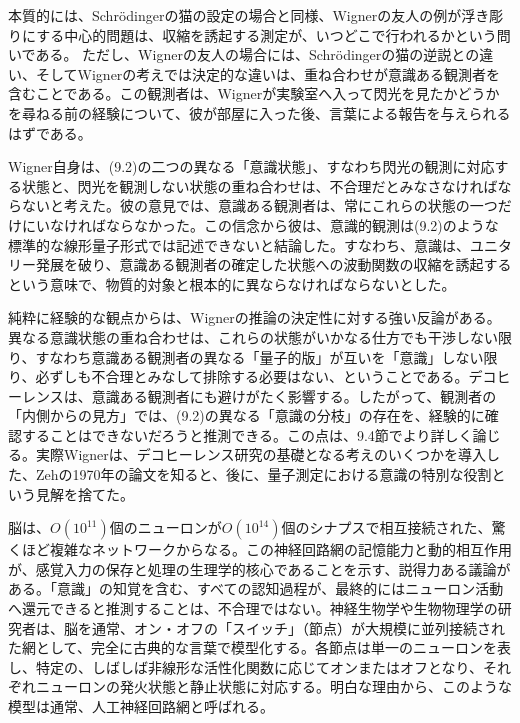 本質的には、Schrödingerの猫の設定の場合と同様、Wignerの友人の例が浮き彫りにする中心的問題は、収縮を誘起する測定が、いつどこで行われるかという問いである。
\hypertarget{srcpage:365}{}\label{srcpage:365}
ただし、Wignerの友人の場合には、Schrödingerの猫の逆説との違い、そしてWignerの考えでは決定的な違いは、重ね合わせが意識ある観測者を含むことである。この観測者は、Wignerが実験室へ入って閃光を見たかどうかを尋ねる前の経験について、彼が部屋に入った後、言葉による報告を与えられるはずである。

Wigner自身は、(9.2)の二つの異なる「意識状態」、すなわち閃光の観測に対応する状態と、閃光を観測しない状態の重ね合わせは、不合理だとみなさなければならないと考えた。彼の意見では、意識ある観測者は、常にこれらの状態の一つだけにいなければならなかった\cite{ref498}。この信念から彼は、意識的観測は(9.2)のような標準的な線形量子形式では記述できないと結論した。すなわち、意識は、ユニタリー発展を破り、意識ある観測者の確定した状態への波動関数の収縮を誘起するという意味で、物質的対象と根本的に異ならなければならないとした。

純粋に経験的な観点からは、Wignerの推論の決定性に対する強い反論がある。異なる意識状態の重ね合わせは、これらの状態がいかなる仕方でも干渉しない限り、すなわち意識ある観測者の異なる「量子的版」が互いを「意識」しない限り、必ずしも不合理とみなして排除する必要はない、ということである。デコヒーレンスは、意識ある観測者にも避けがたく影響する。したがって、観測者の「内側からの見方」では、(9.2)の異なる「意識の分枝」の存在を、経験的に確認することはできないだろうと推測できる。この点は、9.4節でより詳しく論じる。実際Wignerは、デコヒーレンス研究の基礎となる考えのいくつかを導入した、Zehの1970年の論文\cite{ref004}を知ると、後に、量子測定における意識の特別な役割という見解を捨てた\cite{ref499}。

脳は、$O(10^{11})$個のニューロンが$O(10^{14})$個のシナプスで相互接続された、驚くほど複雑なネットワークからなる。この神経回路網の記憶能力と動的相互作用が、感覚入力の保存と処理の生理学的核心であることを示す、説得力ある議論がある。「意識」の知覚を含む、すべての認知過程が、最終的にはニューロン活動へ還元できると推測することは、不合理ではない。神経生物学や生物物理学の研究者は、脳を通常、オン・オフの「スイッチ」（節点）が大規模に並列接続された網として、完全に古典的な言葉で模型化する\cite{ref500,ref501,ref502}。各節点は単一のニューロンを表し、特定の、しばしば非線形な活性化関数に応じてオンまたはオフとなり、それぞれニューロンの発火状態と静止状態に対応する。明白な理由から、このような模型は通常、人工神経回路網と呼ばれる。



